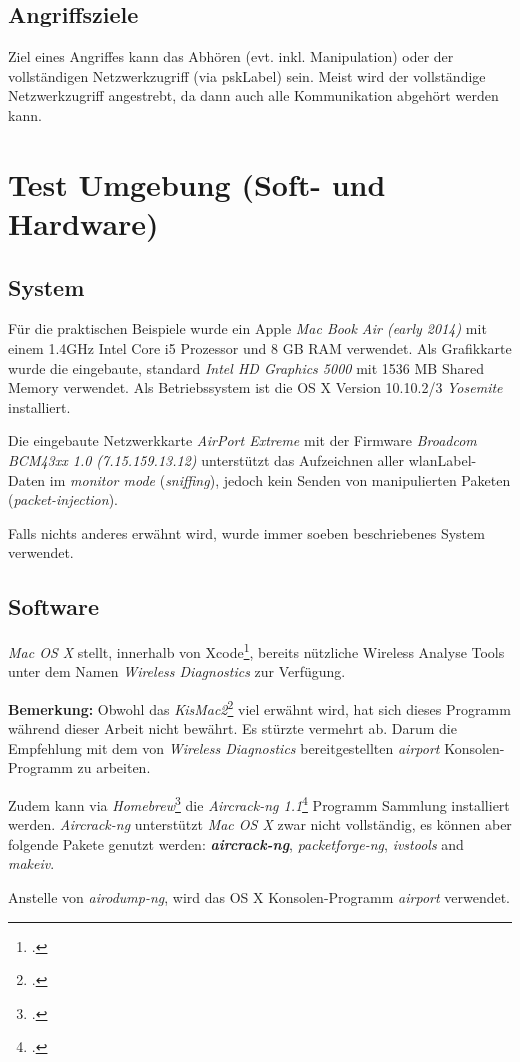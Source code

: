 \subsection{Angriffsziele}
Ziel eines Angriffes kann das Abhören (evt. inkl. Manipulation) oder der vollständigen Netzwerkzugriff (via \gls{pskLabel}) sein.
Meist wird der vollständige Netzwerkzugriff angestrebt, da dann auch alle Kommunikation abgehört werden kann.

\section{Test Umgebung (Soft- und Hardware)}
\label{sec:testEnvroiment}
\subsection{System}
Für die praktischen Beispiele wurde ein Apple \textit{Mac Book Air (early 2014)} mit einem 1.4GHz Intel Core i5 Prozessor und 8 GB RAM verwendet. Als Grafikkarte wurde die eingebaute, standard \textit{Intel HD Graphics 5000} mit 1536 MB Shared Memory verwendet.
Als Betriebssystem ist die OS X Version 10.10.2/3 \textit{Yosemite} installiert.

Die eingebaute Netzwerkkarte \textit{AirPort Extreme} mit der Firmware \textit{Broadcom BCM43xx 1.0 (7.15.159.13.12)} unterstützt das Aufzeichnen aller \gls{wlanLabel}-Daten im \textit{monitor mode} (\textit{sniffing}), jedoch kein Senden von manipulierten Paketen (\textit{packet-injection}).

Falls nichts anderes erwähnt wird, wurde immer soeben beschriebenes System verwendet.


\subsection{Software}
\textit{Mac OS X} stellt, innerhalb von Xcode\footcite{Xcode_Apple_Developer_2015-04-06}, bereits nützliche Wireless Analyse Tools unter dem Namen \textit{Wireless Diagnostics} zur Verfügung.

\begin{framed}
	\textbf{Bemerkung:} Obwohl das \textit{KisMac2}\footcite{IGR_Software_KisMac2_2015-04-06} viel erwähnt wird, hat sich dieses Programm während dieser Arbeit nicht bewährt. Es stürzte vermehrt ab. Darum die Empfehlung mit dem von \textit{Wireless Diagnostics} bereitgestellten \textit{airport} Konsolen-Programm zu arbeiten.
\end{framed}

Zudem kann via \textit{Homebrew}\footcite{Homebrew__The_missing_package_manager_for_OS_X_2015-04-06} die \textit{Aircrack-ng 1.1}\footcite{Aircrack-ng_2015-04-06} Programm Sammlung installiert werden.
\textit{\textit{Aircrack-ng}} unterstützt \textit{Mac OS X} zwar nicht vollständig, es können aber folgende Pakete genutzt werden: \textbf{\textit{aircrack-ng}}, \textit{packetforge-ng}, \textit{ivstools} and \textit{makeiv}.

Anstelle von \textit{airodump-ng}, wird das OS X Konsolen-Programm \textit{airport} verwendet.
